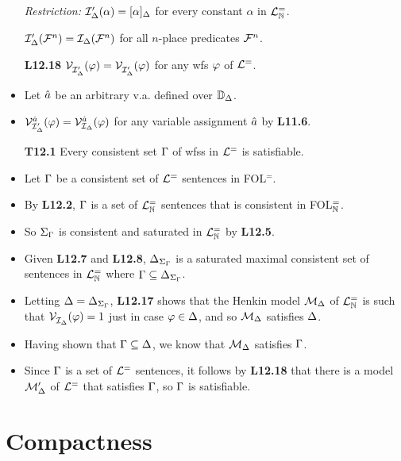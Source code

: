 \documentclass[a4paper, 11pt]{article} %
\begin{document}
\begin{itemize}
  \item[\it Restriction:] $\mathcal{I}'_{\Delta}(\alpha)=[\alpha]_{\Delta}$ for every constant $\alpha$ in $\mathcal{L}^{=}_{\mathbb{N}}$.
    \item[] $\mathcal{I}'_{\Delta}(\mathcal{F}^n)=\mathcal{I}_{\Delta}(\mathcal{F}^n)$ for all $n$-place predicates $\mathcal{F}^n$. 
  \item[\bf L12.18] $\mathcal{V}_{\mathcal{I}'_{\Delta}}^{}(\varphi) = \mathcal{V}_{\mathcal{I}'_{\Delta}}^{}(\varphi)$ for any wfs $\varphi$ of $\mathcal{L}^=$.
    \item Let $\hat{a}$ be an arbitrary v.a. defined over $\mathbb{D}_{\Delta}$. 
    \item $\mathcal{V}_{\mathcal{I}'_{\Delta}}^{\hat{a}}(\varphi) = \mathcal{V}_{\mathcal{I}_{\Delta}}^{\hat{a}}(\varphi)$ for any variable assignment $\hat{a}$ by \textbf{L11.6}.
  \item[\bf T12.1] Every consistent set $\Gamma$ of wfss in $\mathcal{L}^=$ is satisfiable.
    \item Let $\Gamma$ be a consistent set of $\mathcal{L}^=$ sentences in FOL$^=$.
    \item By \textbf{L12.2}, $\Gamma$ is a set of $\mathcal{L}^{=}_{\mathbb{N}}$ sentences that is consistent in FOL$^=_{\mathbb{N}}$.
    \item So $\Sigma_{\Gamma}$ is consistent and saturated in $\mathcal{L}^{=}_{\mathbb{N}}$ by \textbf{L12.5}. 
    \item Given \textbf{L12.7} and \textbf{L12.8}, $\Delta_{\Sigma_{\Gamma}}$ is a saturated maximal consistent set of sentences in $\mathcal{L}^{=}_{\mathbb{N}}$ where $\Gamma\subseteq\Delta_{\Sigma_{\Gamma}}$.
    \item Letting $\Delta=\Delta_{\Sigma_{\Gamma}}$, \textbf{L12.17} shows that the Henkin model $\mathcal{M}_{\Delta}$ of $\mathcal{L}^{=}_{\mathbb{N}}$ is such that $\mathcal{V}_{\mathcal{I}_{\Delta}}^{}{}(\varphi) = 1$ just in case $\varphi\in\Delta$, and so $\mathcal{M}_{\Delta}$ satisfies $\Delta$.
    \item Having shown that $\Gamma\subseteq\Delta$, we know that $\mathcal{M}_{\Delta}$ satisfies $\Gamma$.
    \item Since $\Gamma$ is a set of $\mathcal{L}^=$ sentences, it follows by \textbf{L12.18} that there is a model $\mathcal{M}'_{\Delta}$ of $\mathcal{L}^=$ that satisfies $\Gamma$, so $\Gamma$ is satisfiable.
\end{itemize}


\section*{Compactness}
\end{document}
